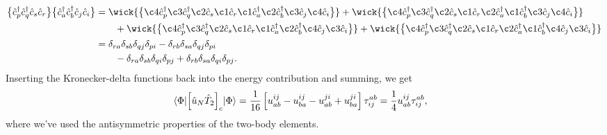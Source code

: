         \begin{align}
            \normalord{
                \ccr{p}
                \ccr{q}
                \can{s}
                \can{r}
            }
            \normalord{
                \ccr{a}
                \ccr{b}
                \can{j}
                \can{i}
            }
            &=
            \wick{
                \normalord{
                    \c4 {\ccr{p}}
                    \c3 {\ccr{q}}
                    \c2 {\can{s}}
                    \c1 {\can{r}}
                    \c1 {\ccr{a}}
                    \c2 {\ccr{b}}
                    \c3 {\can{j}}
                    \c4 {\can{i}}
                }
            }
            +
            \wick{
                \normalord{
                    \c4 {\ccr{p}}
                    \c3 {\ccr{q}}
                    \c2 {\can{s}}
                    \c1 {\can{r}}
                    \c2 {\ccr{a}}
                    \c1 {\ccr{b}}
                    \c3 {\can{j}}
                    \c4 {\can{i}}
                }
            }
            \nonumber \\
            &\qquad
            +
            \wick{
                \normalord{
                    \c4 {\ccr{p}}
                    \c3 {\ccr{q}}
                    \c2 {\can{s}}
                    \c1 {\can{r}}
                    \c1 {\ccr{a}}
                    \c2 {\ccr{b}}
                    \c4 {\can{j}}
                    \c3 {\can{i}}
                }
            }
            +
            \wick{
                \normalord{
                    \c4 {\ccr{p}}
                    \c3 {\ccr{q}}
                    \c2 {\can{s}}
                    \c1 {\can{r}}
                    \c2 {\ccr{a}}
                    \c1 {\ccr{b}}
                    \c4 {\can{j}}
                    \c3 {\can{i}}
                }
            }
            \\
            &=
            \delta_{ra}
            \delta_{sb}
            \delta_{qj}
            \delta_{pi}
            -
            \delta_{rb}
            \delta_{sa}
            \delta_{qj}
            \delta_{pi}
            \nonumber \\
            &\qquad
            -
            \delta_{ra}
            \delta_{sb}
            \delta_{qi}
            \delta_{pj}
            +
            \delta_{rb}
            \delta_{sa}
            \delta_{qi}
            \delta_{pj}.
        \end{align}
        Inserting the Kronecker-delta functions back into the energy
        contribution and summing, we get
        \begin{align}
            \mel{\Phi}{
                \left[ 
                    \hat{u}_N \hat{T}_2
                 \right]_c
            }{\Phi}
            &=
            \frac{1}{16}\left[ 
                u^{ij}_{ab}
                - u^{ij}_{ba}
                - u^{ji}_{ab}
                + u^{ji}_{ba}
             \right]\tau^{ab}_{ij}
            =
            \frac{1}{4}u^{ij}_{ab}\tau^{ab}_{ij},
        \end{align}
        where we've used the antisymmetric properties of the two-body
        elements.

